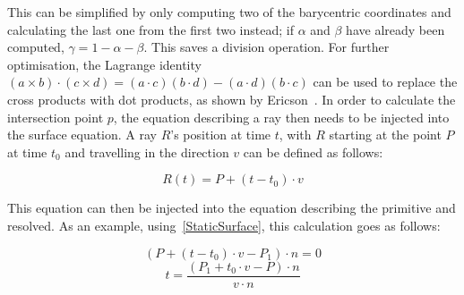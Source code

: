 This can be simplified by only computing two of the barycentric coordinates
and calculating the last one from the first two instead; if \(\alpha\) and \(\beta\) have already been computed,
\(\gamma = 1 - \alpha - \beta\). This saves a division operation.
For further optimisation, the Lagrange identity \((a \times b) \cdot (c \times d) = (a \cdot c)(b \cdot d) - (a \cdot d)(b \cdot c)\)
can be used to replace the cross products with dot products, as shown by Ericson~\cite{Er04}.
\newline
In order to calculate the intersection point \(p\), the equation describing a ray then needs to be injected into the surface equation.
A ray \(R\)'s position at time \(t\), with \(R\) starting at the point \(P\) at time \(t_0\)
and travelling in the direction \(v\) can be defined as follows:

\begin{equation}\label{RayEq}
    R(t) = P + (t - t_0) \cdot v
\end{equation}

This equation can then be injected into the equation describing the primitive and resolved.
As an example, using~\eqref{StaticSurface}, this calculation goes as follows:

\begin{equation*}
    (P + (t - t_0) \cdot v - P_1) \cdot n = 0
\end{equation*}
\begin{equation}\label{StaticSurfaceIntersect}
    t = \frac{(P_1 + t_0 \cdot v - P) \cdot n}{v \cdot n}
\end{equation}

